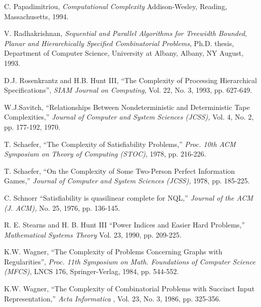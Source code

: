 \begin{thebibliography}{HMRR93}
\iffalse******
\bibitem[PY91]{PY91} C. Papadimitriou and M. Yannakakis,
``Optimization, Approximation and Complexity Classes,''
{\em Journal of Computer and System Sciences (JCSS)}, 
No. 43, 1991, pp. 425-440.
************
\fi


C. Papadimitriou,
{\em Computational Complexity}
Addison-Wesley, Reading, Massachusetts, 1994.




 V. Radhakrishnan,
{\em Sequential and Parallel Algorithms for Treewidth Bounded, Planar
and Hierarchically Specified Combinatorial Problems},
 Ph.D. thesis, Department of Computer Science, 
University at Albany,  Albany, NY August, 1993.


	
 D.J. Rosenkrantz and H.B. Hunt III,
``The Complexity of Processing Hierarchical Specifications'',
{\em SIAM Journal on Computing}, 
Vol. 22, No. 3, 1993, pp. 627-649.





W.J.Savitch, 
``Relationships Between Nondeterministic and Deterministic 
Tape Complexities,'' {\em Journal of Computer and System Sciences (JCSS),} 
Vol. 4, No. 2, pp. 177-192, 1970.


T. Schaefer,
``The Complexity of Satisfiability Problems,''
{\em Proc. 10th ACM Symposium on Theory of Computing (STOC)}, 
1978, pp. 216-226.


T. Schaefer,
``On the Complexity of Some Two-Person Perfect Information Games,''
{\em Journal of Computer and System Sciences (JCSS),} 
1978, pp. 185-225.



 C. Schnorr
``Satisfiability is quasilinear complete for NQL,''
{\em Journal of the ACM (J. ACM),} 
No. 25, 1976, pp. 136-145.


	
 R. E. Stearns and H. B. Hunt III
``Power Indices and Easier Hard Problems,''
{\em Mathematical Systems Theory}
Vol. 23, 1990, pp. 209-225.

  K.W. Wagner,
``The  Complexity of Problems Concerning Graphs with Regularities'',
{\em Proc. 11th Symposium on Math. Foundations of Computer Science (MFCS)},
LNCS 176, Springer-Verlag, 1984, pp. 544-552.


 K.W. Wagner,
``The Complexity of Combinatorial Problems with Succinct 
Input Representation,''
{\em Acta Informatica }, Vol. 23, No. 3, 1986, pp. 325-356.




\end{thebibliography}
